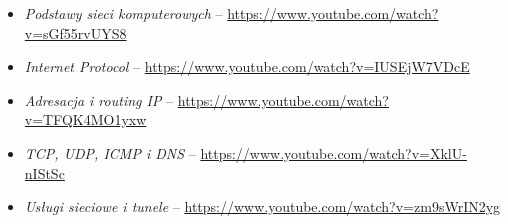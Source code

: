 % 
% 
% 
% 

\begin{itemize}
\item \emph{Podstawy sieci komputerowych} – \url{https://www.youtube.com/watch?v=sGf55rvUYS8}
\item \emph{Internet Protocol} – \url{https://www.youtube.com/watch?v=IUSEjW7VDcE}
\item \emph{Adresacja i routing IP} – \url{https://www.youtube.com/watch?v=TFQK4MO1yxw}
\item \emph{TCP, UDP, ICMP i DNS} – \url{https://www.youtube.com/watch?v=XklU-nIStSc}
\item \emph{Usługi sieciowe i tunele} – \url{https://www.youtube.com/watch?v=zm9sWrIN2yg}
\end{itemize}
